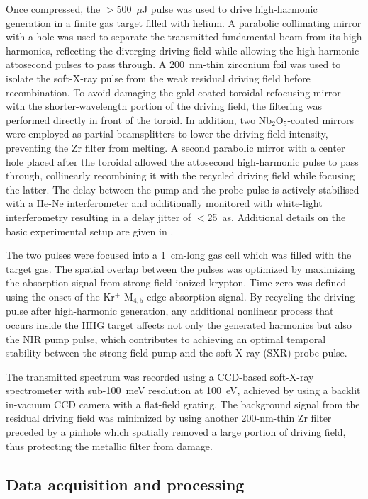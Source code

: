 \documentclass[12pt]{article}
\begin{document}
Once compressed, the $>$500~$\mu$J pulse was used to drive high-harmonic generation in a finite gas target filled with helium. A parabolic collimating mirror with a hole was used to separate the transmitted fundamental beam from its high harmonics, reflecting the diverging driving field while allowing the high-harmonic attosecond pulses to pass through. A 200~nm-thin zirconium foil was used to isolate the soft-X-ray pulse from the weak residual driving field before recombination. To avoid damaging the gold-coated toroidal refocusing mirror with the shorter-wavelength portion of the driving field, the filtering was performed directly in front of the toroid. In addition, two Nb$_2$O$_5$-coated mirrors were employed as partial beamsplitters to lower the driving field intensity, preventing the Zr filter from melting. A second parabolic mirror with a center hole placed after the toroidal allowed the attosecond high-harmonic pulse to pass through, collinearly recombining it with the recycled driving field while focusing the latter. The delay between the pump and the probe pulse is actively stabilised with a He-Ne interferometer and additionally monitored with white-light interferometry resulting in a delay jitter of $<$25~as. Additional details on the basic experimental setup are given in \cite{huppert15a}. 

The two pulses were focused into a 1~cm-long gas cell which was filled with the target gas. The spatial overlap between the pulses was optimized by maximizing the absorption signal from strong-field-ionized krypton. Time-zero was defined using the onset of the Kr$^+$ M$_{4,5}$-edge absorption signal. By recycling the driving pulse after high-harmonic generation, any additional nonlinear process that occurs inside the HHG target affects not only the generated harmonics but also the NIR pump pulse, which contributes to achieving an optimal temporal stability between the strong-field pump and the soft-X-ray (SXR) probe pulse. 

The transmitted spectrum was recorded using a CCD-based soft-X-ray spectrometer with sub-100~meV resolution at 100~eV, achieved by using a backlit in-vacuum CCD camera with a flat-field grating. The background signal from the residual driving field was minimized by using another 200-nm-thin Zr filter preceded by a pinhole which spatially removed a large portion of driving field, thus protecting the metallic filter from damage.

\subsection{Data acquisition and processing}
\end{document}
